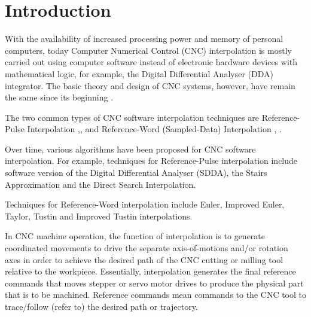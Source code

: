 \justifying
\noindent

\section{Introduction}

With the availability of increased processing power and memory of personal computers, today Computer Numerical Control (CNC) interpolation is mostly carried out using computer software instead of electronic hardware devices with mathematical logic, for example, the Digital Differential Analyser (DDA) integrator. The basic theory and design of CNC systems, however, have remain the same since its beginning \cite{SuhBook_2008}. 
\vspace*{1\baselineskip}


The two common types of CNC software interpolation techniques are Reference-Pulse Interpolation \cite{Giap_2014},\cite{Koren_1981}, and Reference-Word (Sampled-Data) Interpolation \cite{Koren_1982}, \cite{Koren_1978}. 

	\vspace*{1\baselineskip}

Over time, various algorithms have been proposed for CNC software interpolation. For example, techniques for Reference-Pulse interpolation include software version of the Digital Differential Analyser (SDDA), the Stairs Approximation and the Direct Search Interpolation. 

	\vspace*{1\baselineskip}

Techniques for Reference-Word interpolation include Euler, Improved Euler, Taylor, Tustin and Improved Tustin interpolations.

	\vspace*{1\baselineskip}

In CNC machine operation, the function of interpolation is to generate coordinated movements to drive the separate axis-of-motions and/or rotation axes in order to achieve the desired path of the CNC cutting or milling tool relative to the workpiece. Essentially, interpolation generates the final reference commands that moves stepper or servo motor drives to produce the physical part that is to be machined. Reference commands mean commands to the CNC tool to trace/follow (refer to) the desired path or trajectory.

